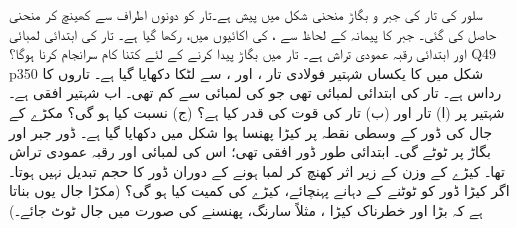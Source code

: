 سلور کی تار  کی جبر و بگاڑ  منحنی شکل  میں پیش ہے۔تار کو دونوں اطراف سے کھینچ کر منحنی حاصل کی گئی۔ جبر کا پیمانہ  کے لحاظ سے ،  کی اکائیوں میں، رکھا گیا ہے۔ تار کی ابتدائی لمبائی  اور ابتدائی رقبہ عمودی تراش  ہے۔ تار میں     بگاڑ پیدا کرنے کے لئے کتنا کام سرانجام کرنا ہوگا؟
Q49 p350
شکل  میں  کا یکساں شہتیر  فولادی تار ،  اور ، سے لٹکا دکھایا گیا ہے۔ تاروں کا رداس  ہے۔  تار  کی   ابتدائی لمبائی  تھی جو  کی لمبائی سے  کم تھی۔ اب شہتیر افقی ہے۔ شہتیر پر (ا) تار  اور (ب) تار  کی قوت کی قدر کیا ہے؟ (ج)  نسبت  کیا ہو گی؟
مکڑے کے جال کی ڈور کے وسطی نقطہ پر  کیڑا پھنسا ہوا شکل  میں دکھایا گیا ہے۔ ڈور  جبر اور  بگاڑ پر ٹوٹے گی۔ ابتدائی طور ڈور افقی تھی؛ اس کی لمبائی  اور رقبہ
 عمودی تراش  تھا۔ کیڑے کے وزن  کے زیر اثر  کھنچ کر لمبا ہونے کے دوران ڈور کا حجم تبدیل نہیں ہوتا۔ اگر کیڑا ڈور کو ٹوٹنے کے دہانے پہنچائے، کیڑے کی کمیت کیا ہو گی؟ (مکڑا جال یوں بناتا ہے کہ   بڑا اور   خطرناک  کیڑا ، مثلاً  سارنگ، پھنسنے کی صورت میں  جال  ٹوٹ جائے۔)

